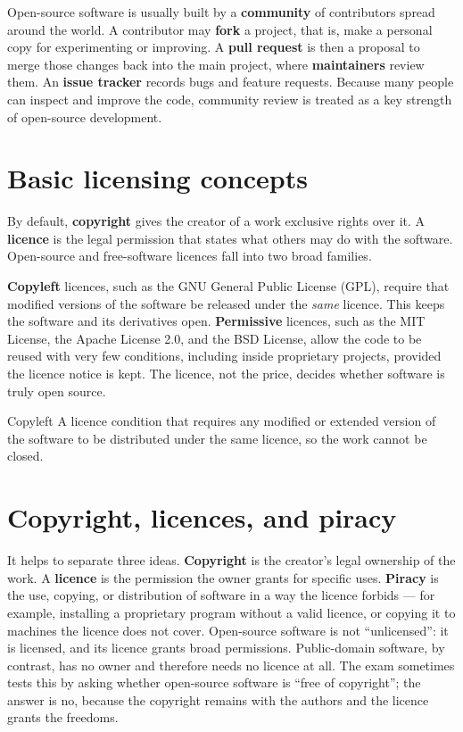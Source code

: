 Open-source software is usually built by a \textbf{community} of contributors
spread around the world. A contributor may \textbf{fork} a project, that is,
make a personal copy for experimenting or improving. A \textbf{pull request}
is then a proposal to merge those changes back into the main project, where
\textbf{maintainers} review them. An \textbf{issue tracker} records bugs and
feature requests. Because many people can inspect and improve the code,
community review is treated as a key strength of open-source development.

\section{Basic licensing concepts}
By default, \textbf{copyright} gives the creator of a work exclusive rights
over it. A \textbf{licence} is the legal permission that states what others
may do with the software. Open-source and free-software licences fall into two
broad families.

\textbf{Copyleft} licences, such as the GNU General Public License (GPL),
require that modified versions of the software be released under the
\emph{same} licence. This keeps the software and its derivatives open.
\textbf{Permissive} licences, such as the MIT License, the Apache License 2.0,
and the BSD License, allow the code to be reused with very few conditions,
including inside proprietary projects, provided the licence notice is kept.
The licence, not the price, decides whether software is truly open source.

\begin{definitionbox}{Copyleft}
A licence condition that requires any modified or extended version of the
software to be distributed under the same licence, so the work cannot be
closed.
\end{definitionbox}

\section{Copyright, licences, and piracy}
It helps to separate three ideas. \textbf{Copyright} is the creator's legal
ownership of the work. A \textbf{licence} is the permission the owner grants
for specific uses. \textbf{Piracy} is the use, copying, or distribution of
software in a way the licence forbids --- for example, installing a
proprietary program without a valid licence, or copying it to machines the
licence does not cover. Open-source software is not ``unlicensed'': it is
licensed, and its licence grants broad permissions. Public-domain software,
by contrast, has no owner and therefore needs no licence at all. The exam
sometimes tests this by asking whether open-source software is ``free of
copyright''; the answer is no, because the copyright remains with the authors
and the licence grants the freedoms.

